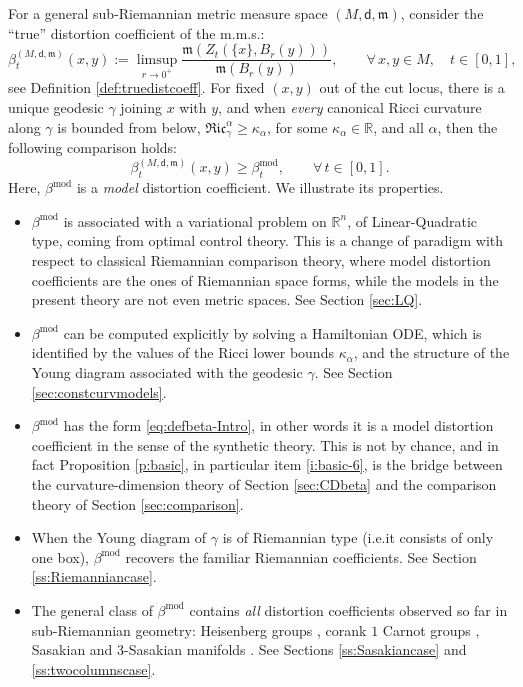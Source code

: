 \documentclass[11pt,a4paper]{article}
\theoremstyle{plain}
\theoremstyle{definition}
\theoremstyle{remark}
\numberwithin{equation}{section}
\newcommand{\R}{\mathbb{R}} %
\newcommand{\mm}{\mathfrak m}
\newcommand{\sfd}{\mathsf d}
\begin{document}
For a general sub-Riemannian metric measure space $(M,\sfd,\mm)$, consider the ``true'' distortion coefficient of the m.m.s.:
\begin{equation}
\beta_t^{(M,\sfd,\mm)}(x,y):=\limsup_{r\to 0^+}\frac{\mm(Z_t(\{x\},B_r(y)))}{\mm(B_r(y))}, \qquad \forall\, x,y\in M,\quad t\in [0,1],
\end{equation}
see Definition \ref{def:truedistcoeff}. For fixed $(x,y)$ out of the cut locus, there is a unique geodesic $\gamma$ joining $x$ with $y$, and when \emph{every} canonical Ricci curvature along $\gamma$ is bounded from below, $\mathfrak{Ric}^\alpha_\gamma\geq \kappa_{\alpha}$, for some $\kappa_\alpha \in \R$, and all $\alpha$, then the following comparison holds:
\begin{equation}\label{eq:thissense-intro}
\beta_t^{(M,\sfd,\mm)}(x,y)\geq \beta_t^{\mathrm{mod}}, \qquad \forall\, t\in [0,1].
\end{equation}
Here, $\beta^{\mathrm{mod}}$ is a \emph{model} distortion coefficient. We illustrate its properties.
\begin{itemize}
\item $\beta^{\mathrm{mod}}$ is associated with a variational problem on $\R^n$, of Linear-Quadratic type, coming from optimal control theory. This is a change of paradigm with respect to classical Riemannian comparison theory, where model distortion coefficients are the ones of Riemannian space forms, while the models in the present theory are not even metric spaces. See Section \ref{sec:LQ}.
\item $\beta^{\mathrm{mod}}$ can be computed explicitly by solving a Hamiltonian ODE,  which is identified by the values of the Ricci lower bounds $\kappa_\alpha$, and the structure of the Young diagram associated with the geodesic $\gamma$. See Section \ref{sec:constcurvmodels}.
\item $\beta^{\mathrm{mod}}$ has the form \eqref{eq:defbeta-Intro}, in other words it is a model distortion coefficient in the sense of the synthetic theory. This is not by chance, and in fact Proposition \ref{p:basic}, in particular item \ref{i:basic-6}, is the bridge between the curvature-dimension theory of Section \ref{sec:CDbeta} and the comparison theory of Section \ref{sec:comparison}.
\item When the Young diagram of $\gamma$ is of Riemannian type (i.e.\@ it consists of only one box), $\beta^{\mathrm{mod}}$ recovers the familiar Riemannian coefficients. See Section \ref{ss:Riemanniancase}.
\item The general class of $\beta^{\mathrm{mod}}$ contains \emph{all} distortion coefficients observed so far in sub-Riemannian geometry: Heisenberg groups \cite{BKS}, corank $1$ Carnot groups \cite{BKS2}, Sasakian \cite{AAPL-Ricci,LeeLiZel-Sasakian} and $3$-Sasakian manifolds \cite{RS-3Sas}. See Sections \ref{ss:Sasakiancase} and \ref{ss:twocolumnscase}.
\end{itemize}
\end{document}
